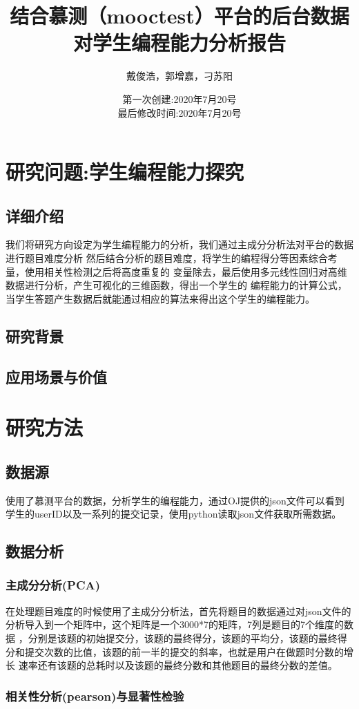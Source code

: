 \documentclass[a4paper]{ctexart}
\title{结合慕测（mooctest）平台的后台数据对学生编程能力分析报告}
\author{\small 戴俊浩，郭增嘉，刁苏阳}
\date{\small 第一次创建:2020年7月20号\\最后修改时间:2020年7月20号}
\begin{document}
\ttfamily \songti
{}
\maketitle
\section{研究问题:学生编程能力探究}
\subsection{详细介绍}
我们将研究方向设定为学生编程能力的分析，我们通过主成分分析法对平台的数据进行题目难度分析
然后结合分析的题目难度，将学生的编程得分等因素综合考量，使用相关性检测之后将高度重复的
变量除去，最后使用多元线性回归对高维数据进行分析，产生可视化的三维函数，得出一个学生的
编程能力的计算公式，当学生答题产生数据后就能通过相应的算法来得出这个学生的编程能力。
\subsection{研究背景}
\subsection{应用场景与价值}
\section{研究方法}
\subsection{数据源}
使用了慕测平台的数据，分析学生的编程能力，通过OJ提供的json文件可以看到学生的userID以及一系列的提交记录，使用python读取json文件获取所需数据。
\subsection{数据分析}
\subsubsection{主成分分析(PCA)}
在处理题目难度的时候使用了主成分分析法，首先将题目的数据通过对json文件的分析导入到一个矩阵中，这个矩阵是一个3000*7的矩阵，7列是题目的7个维度的数据
，分别是该题的初始提交分，该题的最终得分，该题的平均分，该题的最终得分和提交次数的比值，该题的前一半的提交的斜率，也就是用户在做题时分数的增长
速率还有该题的总耗时以及该题的最终分数和其他题目的最终分数的差值。
\subsubsection{相关性分析(pearson)与显著性检验}
\end{document}
